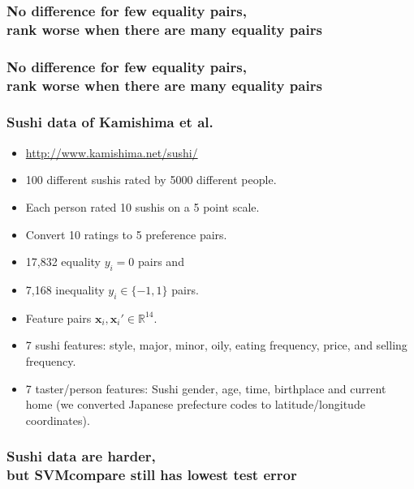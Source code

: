 \documentclass{beamer}
\newcommand{\RR}{\mathbb R}
\begin{document}
%

\begin{frame}
  \frametitle{No difference for few equality pairs,\\
    rank worse when there are many equality pairs}
  \begin{minipage}{1.0\linewidth}
    \hskip -0.5cm
      
  \end{minipage}
\end{frame}

\begin{frame}
  \frametitle{No difference for few equality pairs,\\
    rank worse when there are many equality pairs}
  \begin{minipage}{1.0\linewidth}
    \hskip -0.5cm
      
  \end{minipage}
\end{frame}

\begin{frame}
  \frametitle{Sushi data of Kamishima et al.}
  \begin{itemize}
  \item  \url{http://www.kamishima.net/sushi/}
  \item 100 different sushis rated by 5000 different people.
  \item Each person rated 10 sushis on a 5 point scale. 
  \item Convert 10 ratings to 5 preference pairs.
  \item 17,832 equality $y_i=0$ pairs and
  \item 7,168 inequality $y_i\in\{-1,1\}$ pairs.
  \item Feature pairs $\mathbf x_i,\mathbf x_i'\in\RR^{14}$.
  \item 7 sushi features: style, major, minor, oily, eating frequency,
    price, and selling frequency.
  \item 7 taster/person features: Sushi gender, age, time, birthplace
    and current home (we converted Japanese prefecture codes to
    latitude/longitude coordinates).
  \end{itemize}
\end{frame}

\begin{frame}
  \frametitle{Sushi data are harder,\\
    but SVMcompare still has lowest test error}
  \begin{minipage}{1.0\linewidth}
    \hskip -1cm
      
  \end{minipage}
\end{frame}
\end{document}
